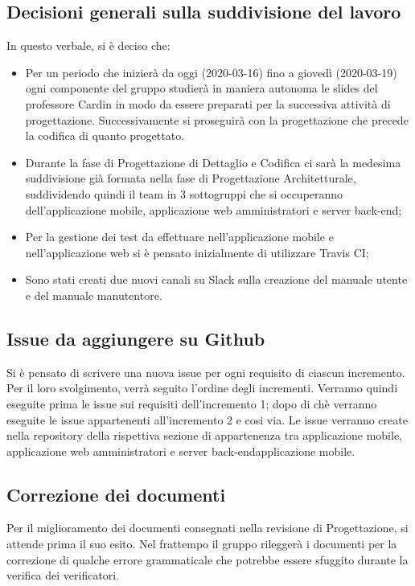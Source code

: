 \subsection{Decisioni generali sulla suddivisione del lavoro}
In questo verbale, si è deciso che:
\begin{itemize}

\item Per un periodo che inizierà da oggi (2020-03-16) fino a giovedì (2020-03-19) ogni componente del gruppo studierà in maniera autonoma le slides del professore Cardin in modo da essere preparati per la successiva attività di progettazione. Successivamente si proseguirà con la progettazione che precede la codifica di quanto progettato.	
\item Durante la fase di Progettazione di Dettaglio e Codifica ci sarà la medesima suddivisione già formata nella fase di Progettazione Architetturale, suddividendo quindi il team in 3 sottogruppi che si occuperanno dell'applicazione mobile, applicazione web amministratori e server back-end;	
	\item Per la gestione dei test da effettuare nell'applicazione mobile e nell'applicazione web si è pensato inizialmente di utilizzare Travis CI;
	\item Sono stati creati due nuovi canali su Slack sulla creazione del manuale utente e del manuale manutentore.
\end{itemize} 

\subsection{Issue da aggiungere su Github}
Si è pensato di scrivere una nuova issue per ogni requisito di ciascun incremento. Per il loro svolgimento, verrà seguito l'ordine degli incrementi. Verranno quindi eseguite prima le issue sui requisiti dell'incremento 1; dopo di chè verranno eseguite le issue appartenenti all'incremento 2 e cosi via.
Le issue verranno create nella repository della rispettiva sezione di appartenenza tra applicazione mobile, applicazione web amministratori e server back-endapplicazione mobile.

\subsection{Correzione dei documenti}
Per il miglioramento dei documenti consegnati nella revisione di Progettazione, si attende prima il suo esito.
Nel frattempo il gruppo rileggerà i documenti per la correzione di qualche errore grammaticale che potrebbe essere sfuggito durante la verifica dei verificatori.

